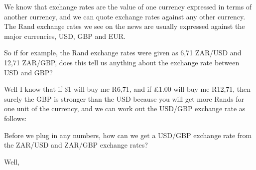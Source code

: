         
        \label{m39335*id67898}We know that exchange rates are the value of one currency expressed in terms of another currency, and we can quote exchange rates against any other currency. The Rand exchange rates we see on the news are usually expressed against the major currencies, USD, GBP and EUR.\par 
        \label{m39335*id67904}So if for example, the Rand exchange rates were given as 6,71 ZAR/USD and 12,71 ZAR/GBP, does this tell us anything about the exchange rate between USD and GBP?\par 
        \label{m39335*id67908}Well I know that if \$1 will buy me R6,71, and if £1.00 will buy me R12,71, then surely the GBP is stronger than the USD because you will get more Rands for one unit of the currency, and we can work out the USD/GBP exchange rate as follows:\par 
        \label{m39335*id67916}Before we plug in any numbers, how can we get a USD/GBP exchange rate from the ZAR/USD and ZAR/GBP exchange rates?\par 
        \label{m39335*id67920}Well,\par 
        \label{m39335*id67923}\nopagebreak\noindent{}
    
